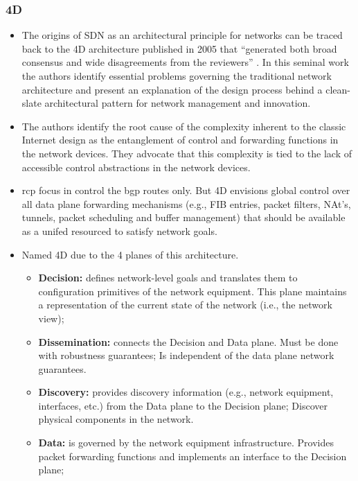 \documentclass[12pt,openright,twoside]{report}
\begin{document}
\subsubsection{4D}
\begin{itemize}
\item  The origins of SDN as an architectural principle for networks can be traced back to the 4D architecture published in  2005 that ``generated both broad consensus and wide disagreements from
the reviewers''  \cite{Greenberg:2005boa}. In this seminal work the authors identify essential
problems governing  the traditional network architecture and  present an
explanation of the design process behind a clean-slate architectural
pattern for network management and innovation.  


\item The authors identify  the root cause of the complexity inherent to the
classic Internet design as the  entanglement  of control and
forwarding functions in the network devices. They advocate that this complexity is tied to the lack of accessible control abstractions in the network devices. 

\item\gls{rcp} focus in control the \gls{bgp} routes only. But 4D envisions global control over all data plane forwarding mechanisms (e.g., FIB entries, packet filters, NAt's, tunnels, packet scheduling and buffer management) that should be available as a unifed  resourced to satisfy network goals. 

\item Named 4D due to the 4 planes of this architecture. 

\begin{itemize}
\item[] \textbf{Decision:}  defines network-level goals and 
  translates them to configuration primitives of the network
  equipment. This plane maintains a representation of the current state of the network (i.e., the network view); 
\item[] \textbf{Dissemination:}  connects the Decision and Data plane. Must be
  done with robustness guarantees; Is independent of the data plane network guarantees. 
\item[] \textbf{Discovery:} provides discovery information (e.g., network
  equipment, interfaces, etc.) from the Data plane to the Decision plane; Discover physical components in the network. 
\item[] \textbf{Data:}  is governed by the network equipment
  infrastructure. Provides packet forwarding functions and implements
  an interface to the Decision plane;  
\end{itemize}


\end{itemize}
\end{document}

